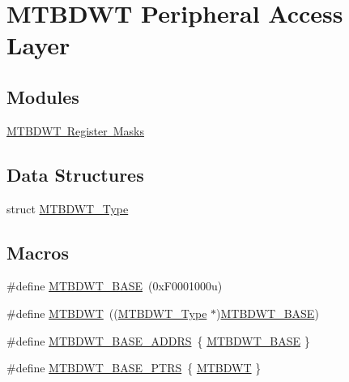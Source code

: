 \hypertarget{group___m_t_b_d_w_t___peripheral___access___layer}{}\section{M\+T\+B\+D\+WT Peripheral Access Layer}
\label{group___m_t_b_d_w_t___peripheral___access___layer}
\subsection*{Modules}
\begin{DoxyCompactItemize}
\item 
\mbox{\hyperlink{group___m_t_b_d_w_t___register___masks}{M\+T\+B\+D\+W\+T Register Masks}}
\end{DoxyCompactItemize}
\subsection*{Data Structures}
\begin{DoxyCompactItemize}
\item 
struct \mbox{\hyperlink{struct_m_t_b_d_w_t___type}{M\+T\+B\+D\+W\+T\+\_\+\+Type}}
\end{DoxyCompactItemize}
\subsection*{Macros}
\begin{DoxyCompactItemize}
\item 
\#define \mbox{\hyperlink{group___m_t_b_d_w_t___peripheral___access___layer_ga35706ac7f77d2b8bad31f491675b3f31}{M\+T\+B\+D\+W\+T\+\_\+\+B\+A\+SE}}~(0x\+F0001000u)
\item 
\#define \mbox{\hyperlink{group___m_t_b_d_w_t___peripheral___access___layer_ga9727da650f73f6eee83b3886f78b8b7a}{M\+T\+B\+D\+WT}}~((\mbox{\hyperlink{struct_m_t_b_d_w_t___type}{M\+T\+B\+D\+W\+T\+\_\+\+Type}} $\ast$)\mbox{\hyperlink{group___m_t_b_d_w_t___peripheral___access___layer_ga35706ac7f77d2b8bad31f491675b3f31}{M\+T\+B\+D\+W\+T\+\_\+\+B\+A\+SE}})
\item 
\#define \mbox{\hyperlink{group___m_t_b_d_w_t___peripheral___access___layer_ga4f0e0610e7386929cf335e6fbdb4b4da}{M\+T\+B\+D\+W\+T\+\_\+\+B\+A\+S\+E\+\_\+\+A\+D\+D\+RS}}~\{ \mbox{\hyperlink{group___m_t_b_d_w_t___peripheral___access___layer_ga35706ac7f77d2b8bad31f491675b3f31}{M\+T\+B\+D\+W\+T\+\_\+\+B\+A\+SE}} \}
\item 
\#define \mbox{\hyperlink{group___m_t_b_d_w_t___peripheral___access___layer_ga0cbd89263cdbe0c07c59ed21112ea9ad}{M\+T\+B\+D\+W\+T\+\_\+\+B\+A\+S\+E\+\_\+\+P\+T\+RS}}~\{ \mbox{\hyperlink{group___m_t_b_d_w_t___peripheral___access___layer_ga9727da650f73f6eee83b3886f78b8b7a}{M\+T\+B\+D\+WT}} \}
\end{DoxyCompactItemize}


